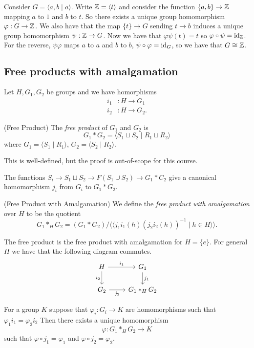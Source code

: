 \documentclass{article}
\begin{document}
\begin{example}
	Consider $ G = \langle a,b \mid a \rangle $. Write $ \mathbb{Z} = \langle t\rangle $ and consider the  function $ \{a,b\} \to \mathbb{Z} $ mapping $ a $ to $ 1 $ and $ b $ to $ t $. So there exists a unique group homomorphism $ \varphi: G \to \mathbb{Z} $. We also have that the map $ \{t\} \to G $ sending $ t \to b $ induces a unique group homomorphism $ \psi: \mathbb{Z} \to G $. Now we have that $ \varphi\psi(t) = t $ so $ \varphi\circ \psi = \mathrm{id}_{\mathbb{Z}} $. For the reverse, $ \psi\varphi $ maps $ a $ to $ a $ and $ b $ to $ b  $, $ \psi\circ\varphi = \mathrm{id}_G $, so we have that $ G\cong \mathbb{Z} $.
\end{example}
\subsection{Free products with amalgamation}
Let $ H,G_1,G_2 $ be groups and we have homorphisms
\begin{align*}
	i_1 &: H \to G_1 \\
	i_2 &: H \to G_2.
\end{align*}
\begin{definition}
	(Free Product) The \textit{free product} of $ G_1 $ and $ G_2 $ is 
	\[
	  G_1 * G_2 = \langle S_1 \sqcup S_2 \mid R_1 \sqcup R_2\rangle
	\]
	where $ G_1 = \langle S_1 \mid R_1 \rangle $, $ G_2 = \langle S_2 \mid R_2 \rangle $.
\end{definition}
This is well-defined, but the proof is out-of-scope for this course.
\par
The functions $ S_i \to S_1 \sqcup S_2 \to F(S_1 \cup S_2) \to G_1 * C_2 $ give a canonical homomorphism $ j_i $ from $ G_i $ to $ G_1 * G_2 $. 
\begin{definition}
	(Free Product with Amalgamation) We define the \textit{free product with amalgamation} over $ H	$ to be the quotient
	\[
		G_1 *_H G_2 = (G_1 * G_2)/\langle\langle j_1i_1(h)(j_2i_2(h))^{-1} \mid h \in H \rangle \rangle.
	\]
\end{definition}
\begin{remark}
	The free product is the free product with amalgamation for $ H = \{e\} $. For general $ H $ we have that the following diagram commutes. 
	\[
	\begin{tikzcd}
H \arrow[r, "i_1"] \arrow[d, "i_2"'] & G_1 \arrow[d, "j_1"] \\
G_2 \arrow[r, "j_2"'] & G_1 *_H G_2
\end{tikzcd}
	\]	
\end{remark}
\begin{proposition}
  For a group $ K $ suppose that $ \varphi_i:G_i\to K $ are homomorphisms such that $ \varphi_1 i_1 = \varphi_2 i_2 $ Then there exists a unique homomorphism
  \[
    \varphi: G_1 *_H G_2 \to K
  \]
  such that $ \varphi\circ j_1 = \varphi_1 $ and $ \varphi\circ j_2 = \varphi_2 $.
\end{proposition}
\end{document}
